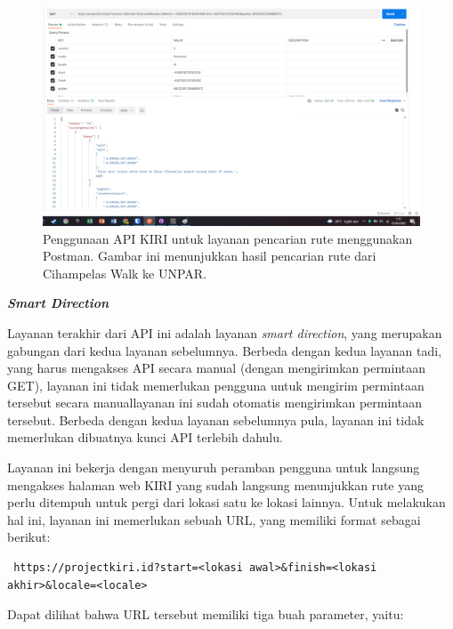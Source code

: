 \documentclass[a4paper,twoside]{article}
\begin{document}
\begin{enumerate}
\begin{figure}[t]
    \centering
    \includegraphics[width=0.74\linewidth]{apikiri-routing}
    \caption[Penggunaan API KIRI untuk layanan pencarian rute]{Penggunaan API KIRI untuk layanan pencarian rute menggunakan Postman. Gambar ini menunjukkan hasil pencarian rute dari Cihampelas Walk ke UNPAR.}
    \label{fig:kiri-api-routing-usage}
\end{figure}

\large{\textbf{\textit{Smart Direction}}}
\label{sec:kiri-api-smartdir}

Layanan terakhir dari API ini adalah layanan \textit{smart direction}, yang merupakan gabungan dari kedua layanan sebelumnya. Berbeda dengan kedua layanan tadi, yang harus mengakses API secara manual (dengan mengirimkan permintaan GET), layanan ini tidak memerlukan pengguna untuk mengirim permintaan tersebut secara manual\textemdash layanan ini sudah otomatis mengirimkan permintaan tersebut. Berbeda dengan kedua layanan sebelumnya pula, layanan ini tidak memerlukan dibuatnya kunci API terlebih dahulu.

Layanan ini bekerja dengan menyuruh peramban pengguna untuk langsung mengakses halaman web KIRI yang sudah langsung menunjukkan rute yang perlu ditempuh untuk pergi dari lokasi satu ke lokasi lainnya. Untuk melakukan hal ini, layanan ini memerlukan sebuah URL, yang memiliki format sebagai berikut:

\begin{verbatim}
 https://projectkiri.id?start=<lokasi awal>&finish=<lokasi akhir>&locale=<locale>
\end{verbatim}
\noindent
Dapat dilihat bahwa URL tersebut memiliki tiga buah parameter, yaitu:


\end{enumerate}
\end{document}
